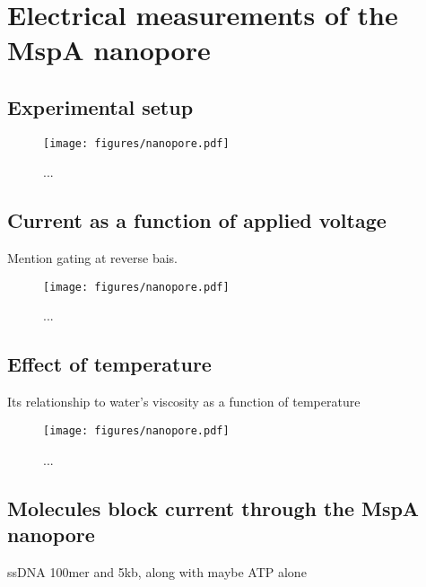 \section{Electrical measurements of the MspA nanopore}

\subsection{Experimental setup}

\begin{figure}[h]
\begin{centering}
\texttt{[image: figures/nanopore.pdf]}
\caption[Experimental setup]{...}
\label{fig:setup}
\end{centering}
\end{figure}

\subsection{Current as a function of applied voltage}

Mention gating at reverse bais.

\begin{figure}[h]
\begin{centering}
\texttt{[image: figures/nanopore.pdf]}
\caption[MspA current versus voltage]{...}
\label{fig:iv_mspa}
\end{centering}
\end{figure}

\subsection{Effect of temperature}

Its relationship to water's viscosity as a function of temperature

\begin{figure}[h]
\begin{centering}
\texttt{[image: figures/nanopore.pdf]}
\caption[MspA current versus temperature]{...}
\label{fig:mspa_current_temp}
\end{centering}
\end{figure}

\subsection{Molecules block current through the MspA nanopore}

ssDNA 100mer and 5kb, along with maybe ATP alone

